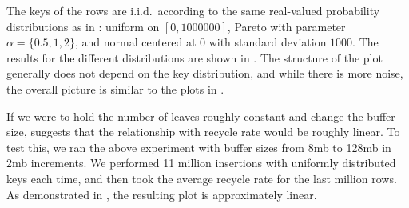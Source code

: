 

The keys of the rows are i.i.d.\ according to the same real-valued probability
distributions as in : uniform on $[0,1000000]$, Pareto
with parameter $\alpha = \{0.5,1,2\}$, and normal centered at 0 with standard
deviation $1000$. The results for the different distributions are shown in
.
The structure of the plot generally does not depend on the key distribution,
and while there is more noise, the overall picture is similar to the plots in
. 

If we were to hold the number of leaves roughly constant and change the buffer
size,  suggests that the relationship with recycle rate
would be roughly linear. To test this, we ran the above experiment with buffer
sizes from 8mb to 128mb in 2mb increments. We performed 11 million insertions
with uniformly distributed keys each time, and then took the average recycle
rate for the last million rows. As demonstrated in , the
resulting plot is approximately linear.

